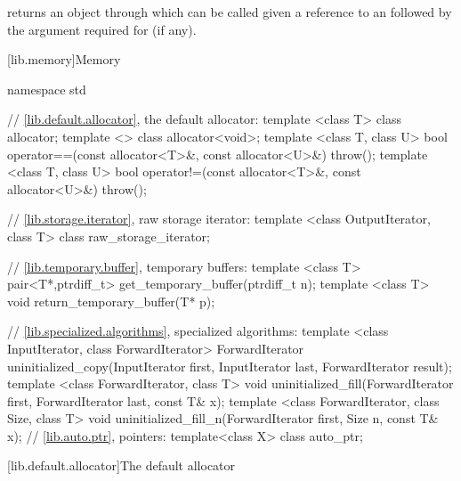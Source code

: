 \begin{itemdescr}
\pnum
{} returns an object through which 
can be called given a reference to an  followed by the argument
required for  (if any).
\end{itemdescr}

[lib.memory]{Memory}


%
\begin{codeblock}
namespace std {
  // \ref{lib.default.allocator}, the default allocator:
  template <class T> class allocator;
  template <> class allocator<void>;
  template <class T, class U>
    bool operator==(const allocator<T>&, const allocator<U>&) throw();
  template <class T, class U>
    bool operator!=(const allocator<T>&, const allocator<U>&) throw();

  // \ref{lib.storage.iterator}, raw storage iterator:
  template <class OutputIterator, class T> class raw_storage_iterator;

  // \ref{lib.temporary.buffer}, temporary buffers:
  template <class T>
    pair<T*,ptrdiff_t> get_temporary_buffer(ptrdiff_t n);
  template <class T>
    void return_temporary_buffer(T* p);

  // \ref{lib.specialized.algorithms}, specialized algorithms:
  template <class InputIterator, class ForwardIterator>
    ForwardIterator
      uninitialized_copy(InputIterator first, InputIterator last,
                         ForwardIterator result);
  template <class ForwardIterator, class T>
    void uninitialized_fill(ForwardIterator first, ForwardIterator last,
                            const T& x);
  template <class ForwardIterator, class Size, class T>
    void uninitialized_fill_n(ForwardIterator first, Size n, const T& x);
  // \ref{lib.auto.ptr}, pointers:
  template<class X> class auto_ptr;
}
\end{codeblock}

[lib.default.allocator]{The default allocator}

